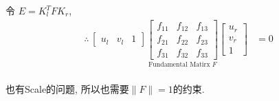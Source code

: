 令 $E=K_l^T F K_r$, 
\begin{align*}
    \therefore \, \begin{bmatrix}
        u_l&v_l&1
    \end{bmatrix}
    \underset{\text{Fundamental Matirx $F$}}{\begin{bmatrix}
        f_{11} & f_{12} & f_{13} \\
        f_{21} & f_{22} & f_{23} \\
        f_{31} & f_{32} & f_{33}
    \end{bmatrix}}\begin{bmatrix}
        u_{r} \\
        v_{r} \\
        1
    \end{bmatrix}&=0\\
\end{align*}

也有Scale的问题, 所以也需要$\|F\|=1$的约束. 

